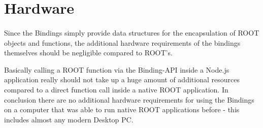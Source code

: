 \section{Hardware}
\paragraph{}
Since the Bindings simply provide data structures for the encapsulation of ROOT objects and functions, the additional hardware requirements of the bindings themselves 
should be negligible compared to ROOT's.\par
Basically calling a ROOT function via the Binding-API inside a Node.js application really should not take up a huge amount of additional resources compared to a direct function call inside a native ROOT application.
In conclusion there are no additional hardware requirements for using the Bindings on a computer that was able to run native ROOT applications before - this includes almost any modern Desktop PC.
